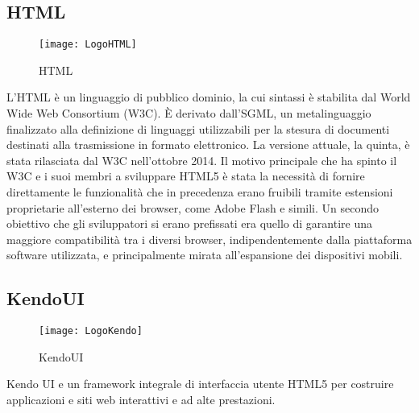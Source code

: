 \subsection{HTML}
\begin{figure}[htpb!]
\center
  \texttt{[image: LogoHTML]}
  \caption{HTML}
\end{figure}
L'HTML\cite{html} è un linguaggio di pubblico dominio, la cui sintassi è stabilita dal World Wide Web Consortium (W3C). È derivato dall'SGML, un metalinguaggio finalizzato alla definizione di linguaggi utilizzabili per la stesura di documenti destinati alla trasmissione in formato elettronico. La versione attuale, la quinta, è stata rilasciata dal W3C nell'ottobre 2014. Il motivo principale che ha spinto il W3C e i suoi membri a sviluppare HTML5 è stata la necessità di fornire direttamente le funzionalità che in precedenza erano fruibili tramite estensioni proprietarie all'esterno dei browser, come Adobe Flash e simili. Un secondo obiettivo che gli sviluppatori si erano prefissati era quello di garantire una maggiore compatibilità tra i diversi browser, indipendentemente dalla piattaforma software utilizzata, e principalmente mirata all'espansione dei dispositivi mobili.
\subsection{KendoUI}
\begin{figure}[htpb!]
\center
  \texttt{[image: LogoKendo]}
  \caption{KendoUI}
\end{figure}
Kendo UI\cite{ken} e un framework integrale di interfaccia utente HTML5 per costruire applicazioni e siti web interattivi e ad alte prestazioni.
\newpage

